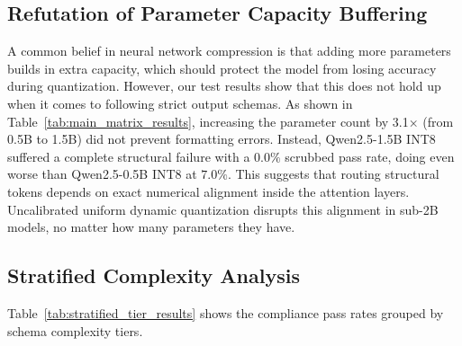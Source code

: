 \documentclass[10pt,journal,compsoc]{IEEEtran}
\begin{document}
\subsection{Refutation of Parameter Capacity Buffering}
A common belief in neural network compression is that adding more parameters builds in extra capacity, which should protect the model from losing accuracy during quantization. However, our test results show that this does not hold up when it comes to following strict output schemas.
As shown in Table~\ref{tab:main_matrix_results}, increasing the parameter count by 3.1× (from 0.5B to 1.5B) did not prevent formatting errors. Instead, Qwen2.5-1.5B INT8 suffered a complete structural failure with a $0.0\%$  scrubbed pass rate, doing even worse than Qwen2.5-0.5B INT8 at $7.0\%$. This suggests that routing structural tokens depends on exact numerical alignment inside the attention layers. Uncalibrated uniform dynamic quantization disrupts this alignment in sub-2B models, no matter how many parameters they have.
\subsection{Stratified Complexity Analysis}
Table~\ref{tab:stratified_tier_results} shows the compliance pass rates grouped by schema complexity tiers.

\begin{table}[h]
\caption{Stratified Structural Compliance Pass Rates across Schema Complexity Tiers.}
\label{tab:stratified_tier_results}
\centering
{}
\end{table}
\end{document}
